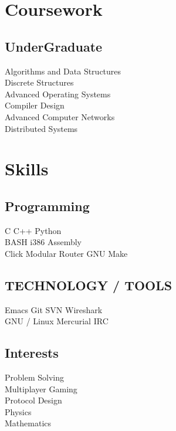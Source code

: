 \documentclass[letterpaper]{deedy-resume} %
\begin{document}
\begin{minipage}[t]{0.33\textwidth}
\section{Coursework}
\subsection{UnderGraduate}
Algorithms and Data Structures \\
Discrete Structures \\
Advanced Operating Systems \\
Compiler Design \\
Advanced Computer Networks \\
Distributed Systems \\
\sectionspace %
\section{Skills}
\subsection{Programming}
C \textbullet{} C++ \textbullet{} Python \\
BASH \textbullet{} i386 Assembly \\
Click Modular Router  \textbullet{} GNU Make \\
\sectionspace %
\subsection{TECHNOLOGY / TOOLS}
Emacs \textbullet{} Git \textbullet{} SVN  \textbullet{} Wireshark \\
GNU / Linux \textbullet{} Mercurial \textbullet{}
IRC \textbullet{}  
\sectionspace %
\subsection{Interests}
Problem Solving \\
Multiplayer Gaming \\
Protocol Design \\
Physics \\
Mathematics \\
\sectionspace %

\end{minipage} %
\end{document}
